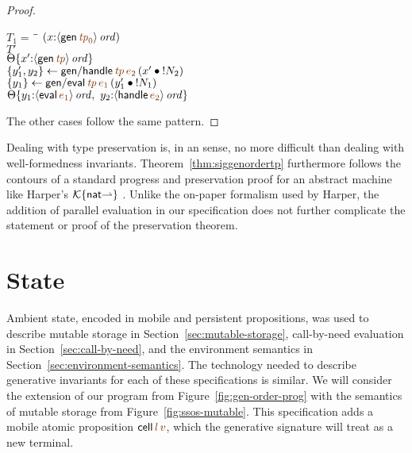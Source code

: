 \begin{proof}
\begin{description}
\begin{tabbing}
$T_1 = ~$ \= \qquad \= $(x{:}\istrue{\susp{{\sf gen}\,\lf{{\it tp}_0}}})$
\\
\>$T'$
\\
\>\>$\tackon{\Theta}{x'{:}\istrue{\susp{{\sf gen}\,\lf{{\it tp}}}}}$
\\
\>$\trstep{y_1',y_2}{{\sf gen/handle}\,\lf{\it tp}\,\lf{e_2}\,(\tfuser{x'}{\tbangr{N_2}})}$
\\
\>$\trstep{y_1}{{\sf gen/eval}\,\lf{\it tp}\,\lf{e_1}\,(\tfuser{y_1'}{\tbangr{N_1}})}$
\\
\>\>$\tackon{\Theta}{y_1{:}\istrue{\susp{{\sf eval}\,\lf{e_1}}}, ~
                   y_2{:}\istrue{\susp{{\sf handle}\,\lf{e_2}}}}$
\end{tabbing}


\end{description}

\noindent
The other cases follow the same pattern.
\end{proof}

Dealing with type preservation is, in an
sense, no more difficult than dealing with well-formedness
invariants. %
Theorem~\ref{thm:siggenordertp} furthermore follows the contours of a standard
progress and preservation proof for an abstract machine like Harper's
$\mathcal K\{{\sf nat}{\rightharpoonup}\}$ \cite[Chapter
27]{harper12practical}.  Unlike the on-paper formalism used by Harper,
the addition of parallel evaluation in our specification does not
further complicate the statement or proof of the preservation theorem.


\section{State}
\label{sec:gen-state}

Ambient state, encoded in mobile and persistent propositions, was used
to describe mutable storage in Section~\ref{sec:mutable-storage},
call-by-need evaluation in Section~\ref{sec:call-by-need}, and the
environment semantics in Section~\ref{sec:environment-semantics}. The
technology needed to describe generative invariants for each of these
specifications is similar. We will consider the extension of our
program from Figure~\ref{fig:gen-order-prog} with the semantics of
mutable storage from Figure~\ref{fig:ssos-mutable}. This specification
adds a mobile atomic proposition ${\sf cell}\,\lf{l}\,\lf{v}$, which
the generative signature will treat as a new terminal.

